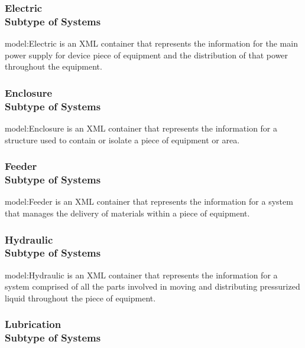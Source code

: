 \FloatBarrier
\subsubsection[Electric]{Electric \\ {\small Subtype of Systems}}
  \label{type:Electric}

\FloatBarrier

{model:Electric} is an XML container that represents the information for the main power supply for device piece of equipment and the distribution of that power throughout the equipment.

\FloatBarrier
\subsubsection[Enclosure]{Enclosure \\ {\small Subtype of Systems}}
  \label{type:Enclosure}

\FloatBarrier

{model:Enclosure} is an XML container that represents the information for a structure used to contain or isolate a piece of equipment or area.

\FloatBarrier
\subsubsection[Feeder]{Feeder \\ {\small Subtype of Systems}}
  \label{type:Feeder}

\FloatBarrier

{model:Feeder} is an XML container that represents the information for a system that manages the delivery of materials within a piece of equipment.

\FloatBarrier
\subsubsection[Hydraulic]{Hydraulic \\ {\small Subtype of Systems}}
  \label{type:Hydraulic}

\FloatBarrier

{model:Hydraulic} is an XML container that represents the information for a system comprised of all the parts involved in moving and distributing pressurized liquid throughout the piece of equipment.

\FloatBarrier
\subsubsection[Lubrication]{Lubrication \\ {\small Subtype of Systems}}
  \label{type:Lubrication}

